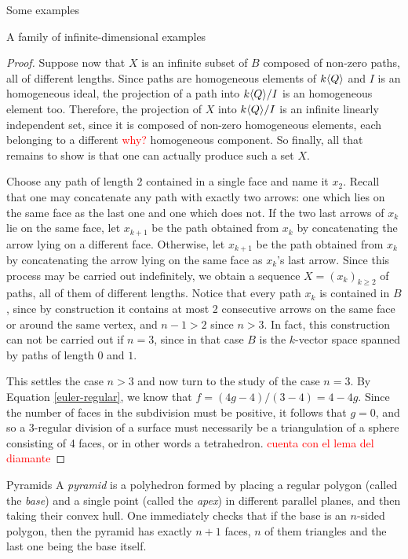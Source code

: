 \begin{chapter}{Some examples}
\begin{section}{A family of infinite-dimensional examples}
\begin{proof}
Suppose now that $X$ is an infinite subset of $B$ composed of non-zero paths, all of different lengths. Since paths are homogeneous elements of $k\langle Q\rangle$ and $I$ is an homogeneous ideal, the projection of a path into $k\langle Q\rangle/I$ is an homogeneous element too. Therefore, the projection of $X$ into $k\langle Q\rangle/I$ is an infinite linearly independent set, since it is composed of non-zero homogeneous elements, each belonging to a different \textcolor{red}{why?} homogeneous component. So finally, all that remains to show is that one can actually produce such a set $X$.

Choose any path of length 2 contained in a single face and name it $x_2$. Recall that one may concatenate any path with exactly two arrows: one which lies on the same face as the last one and one which does not. If the two last arrows of $x_k$ lie on the same face, let $x_{k+1}$ be the path obtained from $x_k$ by concatenating the arrow lying on a different face. Otherwise, let $x_{k+1}$ be the path obtained from $x_k$ by concatenating the arrow lying on the same face as $x_k$'s last arrow. Since this process may be carried out indefinitely, we obtain a sequence $X=(x_k)_{k\geq 2}$ of paths, all of them of different lengths. Notice that every path $x_k$ is contained in $B$, since by construction it contains at most 2 consecutive arrows on the same face or around the same vertex, and $n-1 > 2$ since $n>3$. In fact, this construction can not be carried out if $n=3$, since in that case $B$ is the $k$-vector space spanned by paths of length $0$ and $1$.

This settles the case $n>3$ and now turn to the study of the case $n=3$. By Equation \eqref{euler-regular}, we know that $f=(4g-4)/(3-4)= 4-4g$. Since the number of faces in the subdivision must be positive, it follows that $g=0$, and so a 3-regular division of a surface must necessarily be a triangulation of a sphere consisting of 4 faces, or in other words a tetrahedron. \textcolor{red}{cuenta con el lema del diamante}
\end{proof}
\end{section}

\begin{section}{Pyramids}
A \emph{pyramid} is a polyhedron formed by placing a regular polygon (called the \emph{base}) and a single point (called the \emph{apex}) in different parallel planes, and then taking their convex hull. One immediately checks that if the base is an $n$-sided polygon, then the pyramid has exactly $n+1$ faces, $n$ of them triangles and the last one being the base itself.


\end{section}
\end{chapter}
